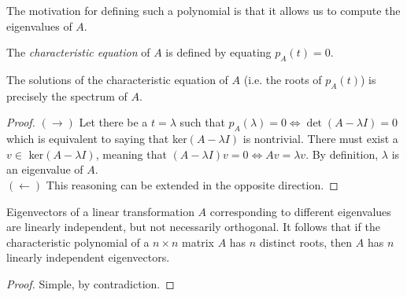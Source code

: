 \documentclass{article}
\begin{document}
    The motivation for defining such a polynomial is that it allows us to compute the eigenvalues of $A$. 
    \begin{definition}
    The \textit{characteristic equation} of $A$ is defined by equating $p_A (t) = 0$. 
    \end{definition}

    \begin{proposition}
    The solutions of the characteristic equation of $A$ (i.e. the roots of $p_A (t)$) is precisely the spectrum of $A$. 
    \end{proposition}

    \begin{proof} $(\rightarrow)$ Let there be a $t = \lambda$ such that $p_A (\lambda) = 0 \iff \det{(A - \lambda I)} = 0$ which is equivalent to saying that ker$(A - \lambda I)$ is nontrivial. There must exist a $v \in $ ker$(A - \lambda I)$, meaning that $(A - \lambda I) v = 0 \iff A v = \lambda v$. By definition, $\lambda$ is an eigenvalue of $A$. \\
    $(\leftarrow)$ This reasoning can be extended in the opposite direction. 
    \end{proof}

    \begin{theorem}
    Eigenvectors of a linear transformation $A$ corresponding to different eigenvalues are linearly independent, but not necessarily orthogonal. It follows that if the characteristic polynomial of a $n \times n$ matrix $A$ has $n$ distinct roots, then $A$ has $n$ linearly independent eigenvectors. 
    \end{theorem}

    \begin{proof}
    Simple, by contradiction.
    \end{proof}
\end{document}

